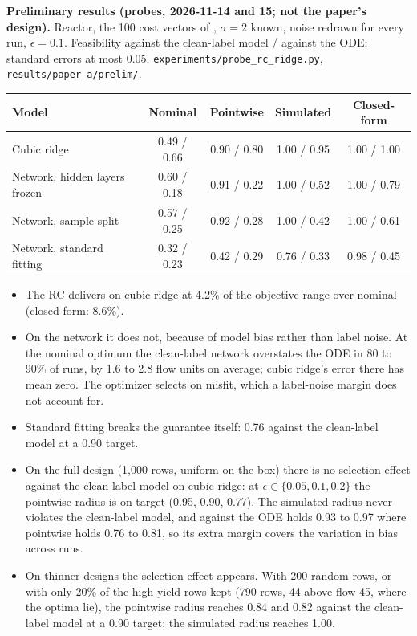\begin{outline}
\textbf{Preliminary results (probes, 2026-11-14 and 15; not the paper's design).}
Reactor, the 100 cost vectors of \citet{ovalle2025cmicl}, $\sigma = 2$ known,
noise redrawn for every run, $\epsilon = 0.1$. Feasibility against the
clean-label model / against the ODE; standard errors at most 0.05.
\texttt{experiments/probe\_rc\_ridge.py}, \texttt{results/paper\_a/prelim/}.

\smallskip
\begin{tabular}{@{}lcccc@{}}
\toprule
Model & Nominal & Pointwise & Simulated & Closed-form \\
\midrule
Cubic ridge                    & 0.49 / 0.66 & 0.90 / 0.80 & 1.00 / 0.95 & 1.00 / 1.00 \\
Network, hidden layers frozen  & 0.60 / 0.18 & 0.91 / 0.22 & 1.00 / 0.52 & 1.00 / 0.79 \\
Network, sample split          & 0.57 / 0.25 & 0.92 / 0.28 & 1.00 / 0.42 & 1.00 / 0.61 \\
Network, standard fitting      & 0.32 / 0.23 & 0.42 / 0.29 & 0.76 / 0.33 & 0.98 / 0.45 \\
\bottomrule
\end{tabular}
\smallskip

\begin{itemize}
  \item The RC delivers on cubic ridge at 4.2\% of the objective range over
    nominal (closed-form: 8.6\%).
  \item On the network it does not, because of model bias rather than label
    noise. At the nominal optimum the clean-label network overstates the ODE in 80
    to 90\% of runs, by 1.6 to 2.8 flow units on average; cubic ridge's error
    there has mean zero. The optimizer selects on misfit, which a label-noise
    margin does not account for.
  \item Standard fitting breaks the guarantee itself: 0.76 against the
    clean-label model at a 0.90 target.
  \item On the full design (1,000 rows, uniform on the box) there is no
    selection effect against the clean-label model on cubic ridge: at
    $\epsilon \in \{0.05, 0.1, 0.2\}$ the pointwise radius is on target (0.95,
    0.90, 0.77). The simulated radius never violates the clean-label model,
    and against the ODE holds 0.93 to 0.97 where pointwise holds 0.76 to
    0.81, so its extra margin covers the variation in bias across runs.
  \item On thinner designs the selection effect appears. With 200 random rows,
    or with only 20\% of the high-yield rows kept (790 rows, 44 above flow 45,
    where the optima lie), the pointwise radius reaches 0.84 and 0.82 against
    the clean-label model at a 0.90 target; the simulated radius reaches 1.00.
\end{itemize}


\end{outline}

